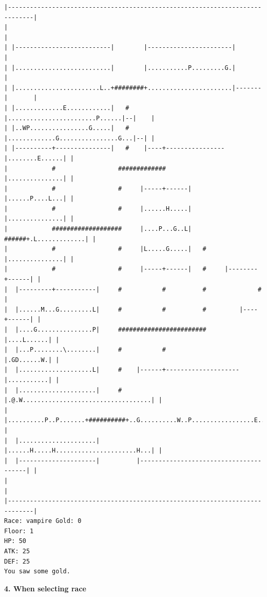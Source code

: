 \documentclass[11pt]{article}
\theoremstyle{plain}
\begin{document}
\begin{Verbatim}[fontsize=\scriptsize]
|-----------------------------------------------------------------------------|
|                                                                             |
| |--------------------------|        |-----------------------|               |
| |..........................|        |...........P.........G.|               |
| |.......................L..+########+.......................|-------|       |
| |.............E............|   #    |........................P......|--|    |
| |..WP................G.....|   #    |.............G................G...|--| |
| |----------+---------------|   #    |----+----------------|........E......| |
|            #                 #############                |...............| |
|            #                 #     |-----+------|         |......P....L...| |
|            #                 #     |......H.....|         |...............| |
|            ###################     |....P...G..L|   ######+.L.............| |
|            #                 #     |L.....G.....|   #     |...............| |
|            #                 #     |-----+------|   #     |--------+------| |
|  |---------+-----------|     #           #          #              #        |
|  |......M...G.........L|     #           #          #         |----+------| |
|  |....G...............P|     ########################         |....L......| |
|  |...P........\........|     #           #                    |.GD......W.| |
|  |....................L|     #    |------+--------------------|...........| |
|  |.....................|     #    |.@.W...................................| |
|  |..........P..P.......+##########+..G..........W..P.................E....| |
|  |.....................|          |......H.....H......................H...| |
|  |---------------------|          |---------------------------------------| |
|                                                                             |
|-----------------------------------------------------------------------------|
Race: vampire Gold: 0                                                  Floor: 1
HP: 50
ATK: 25
DEF: 25
You saw some gold. 
\end{Verbatim}



\newpage
\textbf{4. When selecting race}
\end{document}
